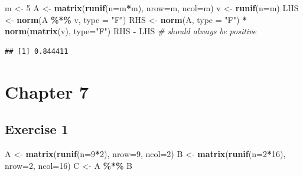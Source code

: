 \documentclass[
]{book}
\newenvironment{Shaded}{\begin{snugshade}}{\end{snugshade}}
\newcommand{\CommentTok}[1]{\textcolor[rgb]{0.56,0.35,0.01}{\textit{#1}}}
\newcommand{\DataTypeTok}[1]{\textcolor[rgb]{0.13,0.29,0.53}{#1}}
\newcommand{\DecValTok}[1]{\textcolor[rgb]{0.00,0.00,0.81}{#1}}
\newcommand{\KeywordTok}[1]{\textcolor[rgb]{0.13,0.29,0.53}{\textbf{#1}}}
\newcommand{\NormalTok}[1]{#1}
\newcommand{\OperatorTok}[1]{\textcolor[rgb]{0.81,0.36,0.00}{\textbf{#1}}}
\newcommand{\StringTok}[1]{\textcolor[rgb]{0.31,0.60,0.02}{#1}}
\begin{document}
\begin{Shaded}
\begin{Highlighting}[]
\NormalTok{m \textless{}{-}}\StringTok{ }\DecValTok{5}
\NormalTok{A \textless{}{-}}\StringTok{ }\KeywordTok{matrix}\NormalTok{(}\KeywordTok{runif}\NormalTok{(}\DataTypeTok{n=}\NormalTok{m}\OperatorTok{*}\NormalTok{m), }\DataTypeTok{nrow=}\NormalTok{m, }\DataTypeTok{ncol=}\NormalTok{m)}
\NormalTok{v \textless{}{-}}\StringTok{ }\KeywordTok{runif}\NormalTok{(}\DataTypeTok{n=}\NormalTok{m)}
\NormalTok{LHS \textless{}{-}}\StringTok{ }\KeywordTok{norm}\NormalTok{(A }\OperatorTok{\%*\%}\StringTok{ }\NormalTok{v, }\DataTypeTok{type =} \StringTok{"F"}\NormalTok{)}
\NormalTok{RHS \textless{}{-}}\StringTok{ }\KeywordTok{norm}\NormalTok{(A, }\DataTypeTok{type =} \StringTok{"F"}\NormalTok{) }\OperatorTok{*}\StringTok{ }\KeywordTok{norm}\NormalTok{(}\KeywordTok{matrix}\NormalTok{(v), }\DataTypeTok{type=}\StringTok{"F"}\NormalTok{)}
\NormalTok{RHS }\OperatorTok{{-}}\StringTok{ }\NormalTok{LHS }\CommentTok{\# should always be positive}
\end{Highlighting}
\end{Shaded}

\begin{verbatim}
## [1] 0.844411
\end{verbatim}

\hypertarget{chapter-7-1}{%
\section*{Chapter 7}\label{chapter-7-1}}

\hypertarget{exercise-1-3}{%
\subsection*{Exercise 1}\label{exercise-1-3}}

\begin{Shaded}
\begin{Highlighting}[]
\NormalTok{A \textless{}{-}}\StringTok{ }\KeywordTok{matrix}\NormalTok{(}\KeywordTok{runif}\NormalTok{(}\DataTypeTok{n=}\DecValTok{9}\OperatorTok{*}\DecValTok{2}\NormalTok{), }\DataTypeTok{nrow=}\DecValTok{9}\NormalTok{, }\DataTypeTok{ncol=}\DecValTok{2}\NormalTok{)}
\NormalTok{B \textless{}{-}}\StringTok{ }\KeywordTok{matrix}\NormalTok{(}\KeywordTok{runif}\NormalTok{(}\DataTypeTok{n=}\DecValTok{2}\OperatorTok{*}\DecValTok{16}\NormalTok{), }\DataTypeTok{nrow=}\DecValTok{2}\NormalTok{, }\DataTypeTok{ncol=}\DecValTok{16}\NormalTok{)}
\NormalTok{C \textless{}{-}}\StringTok{ }\NormalTok{A }\OperatorTok{\%*\%}\StringTok{ }\NormalTok{B}
\end{Highlighting}
\end{Shaded}
\end{document}
